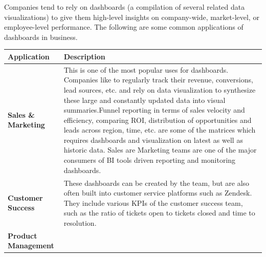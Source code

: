 \documentclass[]{book}
\begin{document}
Companies tend to rely on dashboards (a compilation of several related
data visualizations) to give them high-level insights on company-wide,
market-level, or employee-level performance. The following are some
common applications of dashboards in business.

\begin{longtable}[]{@{}ll@{}}
\toprule
\begin{minipage}[b]{0.16\columnwidth}\raggedright\strut
\textbf{Application}\strut
\end{minipage} & \begin{minipage}[b]{0.78\columnwidth}\raggedright\strut
\textbf{Description}\strut
\end{minipage}\tabularnewline
\midrule
\endhead
\begin{minipage}[t]{0.16\columnwidth}\raggedright\strut
\textbf{Sales \& Marketing}\strut
\end{minipage} & \begin{minipage}[t]{0.78\columnwidth}\raggedright\strut
This is one of the most popular uses for dashboards. Companies like to
regularly track their revenue, conversions, lead sources, etc. and rely
on data visualization to synthesize these large and constantly updated
data into visual summaries.Funnel reporting in terms of sales velocity
and efficiency, comparing ROI, distribution of opportunities and leads
across region, time, etc. are some of the matrices which requires
dashboards and visualization on latest as well as historic data. Sales
are Marketing teams are one of the major consumers of BI tools driven
reporting and monitoring dashboards.\strut
\end{minipage}\tabularnewline
\begin{minipage}[t]{0.16\columnwidth}\raggedright\strut
\textbf{Customer Success}\strut
\end{minipage} & \begin{minipage}[t]{0.78\columnwidth}\raggedright\strut
These dashboards can be created by the team, but are also often built
into customer service platforms such as Zendesk. They include various
KPIs of the customer success team, such as the ratio of tickets open to
tickets closed and time to resolution.\strut
\end{minipage}\tabularnewline
\begin{minipage}[t]{0.16\columnwidth}\raggedright\strut
\textbf{Product Management}\strut
\end{minipage} & \begin{minipage}[t]{0.78\columnwidth}\raggedright\strut

\end{minipage}
\end{longtable}
\end{document}
